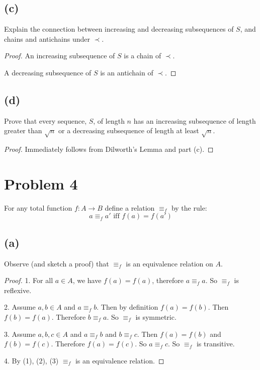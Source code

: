 \documentclass[14pt]{extarticle}
\begin{document}
\subsection{(c)}
Explain the connection between increasing and decreasing subsequences of $S$, and chains and antichains under $\prec$.
\begin{proof}
An increasing subsequence of $S$ is a chain of $\prec$.

A decreasing subsequence of $S$ is an antichain of $\prec$.
\end{proof}

\subsection{(d)}
Prove that every sequence, $S$, of length $n$ has an increasing subsequence of length greater than $\sqrt{n}$ or a decreasing subsequence of length at least $\sqrt{n}$.
\begin{proof}
Immediately follows from Dilworth's Lemma and part (c).
\end{proof}

\section{Problem 4}
For any total function $f: A \to B$ define a relation $\equiv_f$ by the rule:
$$
a \equiv_f a' \text{ iff } f(a) = f(a')
$$

\subsection{(a)}
Observe (and sketch a proof) that $\equiv_f$ is an equivalence relation on $A$.
\begin{proof}
1. For all $a \in A$, we have $f(a) = f(a)$, therefore $a \equiv_f a$. So $\equiv_f$ is reflexive.

2. Assume $a, b \in A$ and $a \equiv_f b$. Then by definition $f(a) = f(b)$. Then $f(b) = f(a)$. Therefore $b \equiv_f a$. So $\equiv_f$ is symmetric.

3. Assume $a,b,c \in A$ and $a \equiv_f b$ and $b \equiv_f c$. Then $f(a) = f(b)$ and $f(b) = f(c)$. Therefore $f(a) = f(c)$. So $a \equiv_f c$. So $\equiv_f$ is transitive.

4. By (1), (2), (3) $\equiv_f$ is an equivalence relation.
\end{proof}
\end{document}
